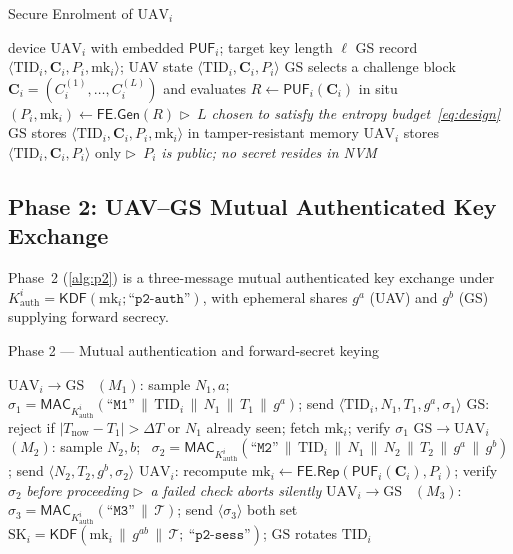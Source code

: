 \documentclass[11pt,a4paper]{article}
\theoremstyle{jrnlplain}
\theoremstyle{jrnldef}
\newcommand{\GS}{\mathrm{GS}}
\newcommand{\UAV}{\mathrm{UAV}}
\newcommand{\PUF}{\mathsf{PUF}}
\newcommand{\TID}{\mathrm{TID}}
\newcommand{\mk}{\mathrm{mk}}
\newcommand{\SK}{\mathrm{SK}}
\newcommand{\MAC}{\mathsf{MAC}}
\newcommand{\KDF}{\mathsf{KDF}}
\newcommand{\Gen}{\mathsf{Gen}}
\newcommand{\Rep}{\mathsf{Rep}}
\newcommand{\FE}{\mathsf{FE}}
\newcommand{\lbl}[1]{\text{``}\texttt{#1}\text{''}}
\newcommand{\catt}{\,\|\,}
\newcommand{\transcript}{\mathcal{T}}
\newcommand{\cmnt}[1]{\hfill\ensuremath{\triangleright}~\textit{#1}}
\begin{document}
\begin{algorithm}[t]
\caption{Secure Enrolment of $\UAV_i$}
\label{alg:p1}
\begin{spacing}{1.3}
\begin{algorithmic}[1]
\REQUIRE device $\UAV_i$ with embedded $\PUF_i$; target key length $\ell$
\ENSURE GS record $\langle\TID_i,\bm{C}_i,P_i,\mk_i\rangle$; UAV state $\langle\TID_i,\bm{C}_i,P_i\rangle$
\STATE $\GS$ selects a challenge block $\bm{C}_i=(C_i^{(1)},\dots,C_i^{(L)})$ and evaluates $R\gets\PUF_i(\bm{C}_i)$ in situ
\STATE $(P_i,\mk_i)\gets\FE.\Gen(R)$ \cmnt{$L$ chosen to satisfy the entropy budget~\eqref{eq:design}}
\STATE $\GS$ stores $\langle\TID_i,\bm{C}_i,P_i,\mk_i\rangle$ in tamper-resistant memory
\STATE $\UAV_i$ stores $\langle\TID_i,\bm{C}_i,P_i\rangle$ only \cmnt{$P_i$ is public; no secret resides in NVM}
\end{algorithmic}
\end{spacing}
\end{algorithm}

\subsection{Phase 2: UAV--GS Mutual Authenticated Key Exchange}
\label{sec:p2}
Phase~2 (\cref{alg:p2}) is a three-message mutual authenticated key exchange
under $K^{i}_{\mathrm{auth}}=\KDF(\mk_i;\lbl{p2-auth})$, with ephemeral shares
$g^{a}$ (UAV) and $g^{b}$ (GS) supplying forward secrecy.

\begin{algorithm}[t]
\caption{Phase 2 --- Mutual authentication and forward-secret keying}
\label{alg:p2}
\begin{spacing}{1.3}
\begin{algorithmic}[1]
\STATE $\UAV_i\!\to\!\GS$ \ $(M_1)$: sample $N_1,a$; \ $\sigma_1=\MAC_{K^{i}_{\mathrm{auth}}}(\lbl{M1}\catt\TID_i\catt N_1\catt T_1\catt g^{a})$; send $\langle\TID_i,N_1,T_1,g^{a},\sigma_1\rangle$
\STATE $\GS$: reject if $|T_{\mathrm{now}}-T_1|>\Delta T$ or $N_1$ already seen; fetch $\mk_i$; verify $\sigma_1$
\STATE $\GS\!\to\!\UAV_i$ \ $(M_2)$: sample $N_2,b$; \ $\sigma_2=\MAC_{K^{i}_{\mathrm{auth}}}(\lbl{M2}\catt\TID_i\catt N_1\catt N_2\catt T_2\catt g^{a}\catt g^{b})$; send $\langle N_2,T_2,g^{b},\sigma_2\rangle$
\STATE $\UAV_i$: recompute $\mk_i\gets\FE.\Rep(\PUF_i(\bm{C}_i),P_i)$; verify $\sigma_2$ \emph{before proceeding} \cmnt{a failed check aborts silently}
\STATE $\UAV_i\!\to\!\GS$ \ $(M_3)$: $\sigma_3=\MAC_{K^{i}_{\mathrm{auth}}}(\lbl{M3}\catt\transcript)$; send $\langle\sigma_3\rangle$
\STATE both set $\SK_i=\KDF(\mk_i\catt g^{ab}\catt\transcript;\ \lbl{p2-sess})$; $\GS$ rotates $\TID_i$
\end{algorithmic}
\end{spacing}
\end{algorithm}
\end{document}
